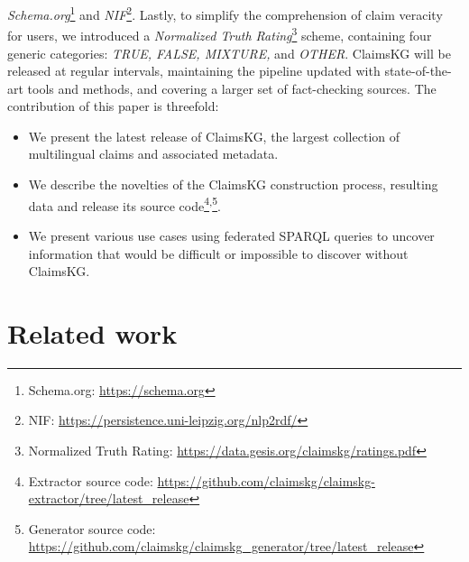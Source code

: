 \documentclass[
]{ceurart}
\begin{document}
\textit{Schema.org}\footnote{Schema.org: \url{https://schema.org}} and \textit{NIF}\footnote{NIF: \url{https://persistence.uni-leipzig.org/nlp2rdf/}}.  Lastly, to simplify the comprehension of claim veracity for users, we introduced a 
\textit{Normalized Truth Rating}\footnote{Normalized Truth Rating: \url{https://data.gesis.org/claimskg/ratings.pdf}} scheme, containing four generic categories: \textit{TRUE, FALSE, MIXTURE,} and \textit{OTHER}. ClaimsKG will be released at regular intervals, maintaining the pipeline updated with state-of-the-art tools and methods, and covering a larger set of fact-checking sources.  
The contribution of this paper is threefold: \vspace{-2mm} 
\begin{itemize}
  \item We present the latest release of ClaimsKG, the largest collection of multilingual claims and associated metadata.
  
  \item We describe the novelties of the ClaimsKG construction process, resulting data and release its source code\footnote{Extractor source code: \url{https://github.com/claimskg/claimskg-extractor/tree/latest\_release}}\textsuperscript{,}\footnote{Generator source code: \url{https://github.com/claimskg/claimskg\_generator/tree/latest\_release}}.
  
  \item We present various use cases using federated SPARQL queries to uncover information that would be difficult or impossible to discover without ClaimsKG. 
 
\end{itemize}
\vspace{-7mm}
\section{Related work}
\vspace{-2mm}
\end{document}
